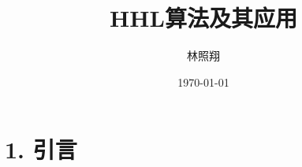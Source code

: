 \documentclass[aps,prl,twocolumn,groupedaddress]{revtex4-2}
\begin{document}

\title{HHL算法及其应用}


\author{林照翔}


\date{\today}

\begin{abstract}
\end{abstract}


\maketitle

\section{1. 引言}
\end{document}
